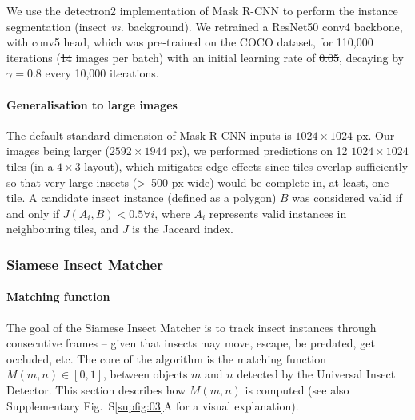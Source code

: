 \documentclass[12pt]{article}
\providecommand{\DIFaddtex}[1]{{\protect\color{blue}\uwave{#1}}} %
\providecommand{\DIFdeltex}[1]{{\protect\color{red}\sout{#1}}}                      %
\providecommand{\DIFaddbegin}{} %
\providecommand{\DIFaddend}{} %
\providecommand{\DIFdelbegin}{} %
\providecommand{\DIFdelend}{} %
\providecommand{\DIFadd}[1]{\texorpdfstring{\DIFaddtex{#1}}{#1}} %
\providecommand{\DIFdel}[1]{\texorpdfstring{\DIFdeltex{#1}}{}} %
\newcommand{\DIFscaledelfig}{0.5}
\newlength{\DIFdelgraphicswidth} %
\newlength{\DIFdelgraphicsheight} %
\newcommand{\DIFaddincludegraphics}[2][]{{\color{blue}\fbox{\DIFOincludegraphics[#1]{#2}}}} %
\newcommand{\DIFdelincludegraphics}[2][]{%
\sbox{\DIFdelgraphicsbox}{\DIFOincludegraphics[#1]{#2}}%
\settoboxwidth{\DIFdelgraphicswidth}{\DIFdelgraphicsbox} %
\settoboxtotalheight{\DIFdelgraphicsheight}{\DIFdelgraphicsbox} %
\scalebox{\DIFscaledelfig}{%
\parbox[b]{\DIFdelgraphicswidth}{\usebox{\DIFdelgraphicsbox}\\[-\baselineskip] \rule{\DIFdelgraphicswidth}{0em}}\llap{\resizebox{\DIFdelgraphicswidth}{\DIFdelgraphicsheight}{%
\setlength{\unitlength}{\DIFdelgraphicswidth}%
\begin{picture}(1,1)%
\thicklines\linethickness{2pt} %
{\color[rgb]{1,0,0}\put(0,0){\framebox(1,1){}}}%
{\color[rgb]{1,0,0}\put(0,0){\line( 1,1){1}}}%
{\color[rgb]{1,0,0}\put(0,1){\line(1,-1){1}}}%
\end{picture}%
}\hspace*{3pt}}} %
} %
\DeclareRobustCommand{\DIFaddbegin}{\DIFOaddbegin \let\includegraphics\DIFaddincludegraphics} %
\DeclareRobustCommand{\DIFaddend}{\DIFOaddend \let\includegraphics\DIFOincludegraphics} %
\DeclareRobustCommand{\DIFdelbegin}{\DIFOdelbegin \let\includegraphics\DIFdelincludegraphics} %
\DeclareRobustCommand{\DIFdelend}{\DIFOaddend \let\includegraphics\DIFOincludegraphics} %
\begin{document}
\begin{linenumbers}
\DIFdelend We use the detectron2 implementation \cite{wu_detectron2_2019} of Mask R-CNN to perform the instance segmentation (insect \emph{vs.} background). We retrained a ResNet50 conv4 backbone, with conv5 head, which was pre-trained on the COCO dataset, 
		for 110,000 iterations 
		(\DIFdelbegin \DIFdel{14 }\DIFdelend \DIFaddbegin \DIFadd{12 }\DIFaddend images per batch) with an initial learning rate of \DIFdelbegin \DIFdel{0.05}\DIFdelend \DIFaddbegin \DIFadd{0.02}\DIFaddend , decaying by $\gamma=0.8$ every 10,000 iterations.

		\paragraph{Generalisation to large images}
		The default standard dimension of Mask R-CNN inputs is $1024 \times{} 1024$ px. 
		Our images being larger ($2592 \times{} 1944$ px), we performed predictions on 12 $1024 \times{}1024$ tiles (in a $4 \times{} 3$ layout), which mitigates edge effects since tiles overlap sufficiently so that very large insects (>~500 px wide) would be complete in, at least, one tile. A candidate insect instance (defined as a polygon) $B$ was considered valid if and only if $J(A_{i}, B) < 0.5 \forall i$, where $A_i$ represents valid instances in neighbouring tiles, and $J$ is the Jaccard index.

		\subsubsection*{Siamese Insect Matcher}
		\paragraph{Matching function}
		The goal of the Siamese Insect Matcher is to track insect instances through consecutive frames – given that insects may move, escape, be predated, get occluded, etc. The core of the algorithm is the matching function $M(m,n) \in [0, 1]$, between objects $m$ and $n$ detected by the Universal Insect Detector. This section describes how $M(m,n)$ is computed (see also Supplementary Fig.~S\ref{supfig:03}A for a visual explanation).


\end{linenumbers}
\end{document}
